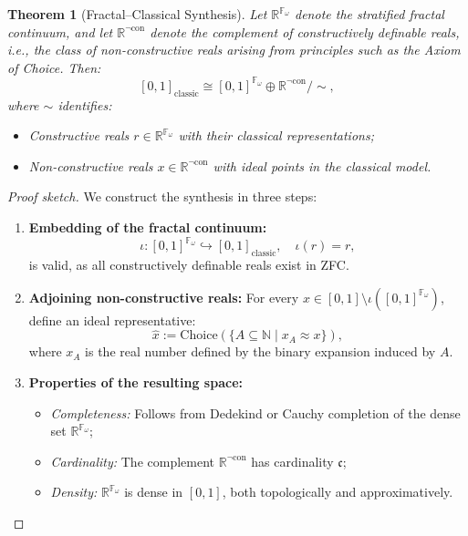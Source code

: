 \documentclass[12pt]{article}
\theoremstyle{definition}
\theoremstyle{plain}
\newtheorem{theorem}[definition]{Theorem}
\theoremstyle{remark}
\begin{document}
\begin{theorem}[Fractal–Classical Synthesis]
Let \( \mathbb{R}^{\mathbb{F}_\omega} \) denote the stratified fractal continuum, and let \( \mathbb{R}^{\neg\mathrm{con}} \) denote the complement of constructively definable reals, i.e., the class of non-constructive reals arising from principles such as the Axiom of Choice. Then:
\[
[0,1]_{\mathrm{classic}} \cong [0,1]^{\mathbb{F}_\omega} \oplus \mathbb{R}^{\neg\mathrm{con}} \big/ \sim,
\]
where \( \sim \) identifies:
\begin{itemize}
    \item Constructive reals \( r \in \mathbb{R}^{\mathbb{F}_\omega} \) with their classical representations;
    \item Non-constructive reals \( x \in \mathbb{R}^{\neg\mathrm{con}} \) with ideal points in the classical model.
\end{itemize}
\end{theorem}

\begin{proof}[Proof sketch]
We construct the synthesis in three steps:
\begin{enumerate}
\item \textbf{Embedding of the fractal continuum:}
\[
\iota : [0,1]^{\mathbb{F}_\omega} \hookrightarrow [0,1]_{\mathrm{classic}}, \quad \iota(r) = r,
\]
is valid, as all constructively definable reals exist in ZFC.

\item \textbf{Adjoining non-constructive reals:}  
For every \( x \in [0,1] \setminus \iota([0,1]^{\mathbb{F}_\omega}) \), define an ideal representative:
\[
\hat{x} := \mathrm{Choice}\left( \{ A \subseteq \mathbb{N} \mid x_A \approx x \} \right),
\]
where \( x_A \) is the real number defined by the binary expansion induced by \( A \).

\item \textbf{Properties of the resulting space:}
\begin{itemize}
    \item \emph{Completeness:} Follows from Dedekind or Cauchy completion of the dense set \( \mathbb{R}^{\mathbb{F}_\omega} \);
    \item \emph{Cardinality:} The complement \( \mathbb{R}^{\neg\mathrm{con}} \) has cardinality \( \mathfrak{c} \);
    \item \emph{Density:} \( \mathbb{R}^{\mathbb{F}_\omega} \) is dense in \( [0,1] \), both topologically and approximatively.
\end{itemize}
\end{enumerate}
\end{proof}
\end{document}
